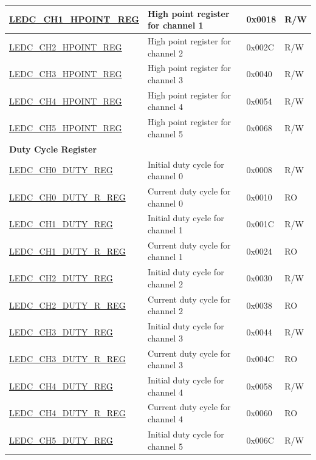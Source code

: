 \begin{longtable}{ | p{5.5cm} | p{7.2cm} | p{1.3cm} | p{1.5cm} | }
\hyperref[regdesc:LEDCCHNHPOINTREG]{LEDC\_CH1\_HPOINT\_REG} & High point register for channel 1 & 0x0018 & R/W \\ \hline
\hyperref[regdesc:LEDCCHNHPOINTREG]{LEDC\_CH2\_HPOINT\_REG} & High point register for channel 2 & 0x002C & R/W \\ \hline
\hyperref[regdesc:LEDCCHNHPOINTREG]{LEDC\_CH3\_HPOINT\_REG} & High point register for channel 3 & 0x0040 & R/W \\ \hline
\hyperref[regdesc:LEDCCHNHPOINTREG]{LEDC\_CH4\_HPOINT\_REG} & High point register for channel 4 & 0x0054 & R/W \\ \hline
\hyperref[regdesc:LEDCCHNHPOINTREG]{LEDC\_CH5\_HPOINT\_REG} & High point register for channel 5 & 0x0068 & R/W \\ \hline
\multicolumn{4}{|l|}{\textbf{Duty Cycle Register}} \\ \hline
\hyperref[regdesc:LEDCCHNDUTYREG]{LEDC\_CH0\_DUTY\_REG} & Initial duty cycle for channel 0 & 0x0008 & R/W \\ \hline
\hyperref[regdesc:LEDCCHNDUTYRREG]{LEDC\_CH0\_DUTY\_R\_REG} & Current duty cycle for channel 0 & 0x0010 & RO \\ \hline
\hyperref[regdesc:LEDCCHNDUTYREG]{LEDC\_CH1\_DUTY\_REG} & Initial duty cycle for channel 1 & 0x001C & R/W \\ \hline
\hyperref[regdesc:LEDCCHNDUTYRREG]{LEDC\_CH1\_DUTY\_R\_REG} & Current duty cycle for channel 1 & 0x0024 & RO \\ \hline
\hyperref[regdesc:LEDCCHNDUTYREG]{LEDC\_CH2\_DUTY\_REG} & Initial duty cycle for channel 2 & 0x0030 & R/W \\ \hline
\hyperref[regdesc:LEDCCHNDUTYRREG]{LEDC\_CH2\_DUTY\_R\_REG} & Current duty cycle for channel 2 & 0x0038 & RO \\ \hline
\hyperref[regdesc:LEDCCHNDUTYREG]{LEDC\_CH3\_DUTY\_REG} & Initial duty cycle for channel 3 & 0x0044 & R/W \\ \hline
\hyperref[regdesc:LEDCCHNDUTYRREG]{LEDC\_CH3\_DUTY\_R\_REG} & Current duty cycle for channel 3 & 0x004C & RO \\ \hline
\hyperref[regdesc:LEDCCHNDUTYREG]{LEDC\_CH4\_DUTY\_REG} & Initial duty cycle for channel 4 & 0x0058 & R/W \\ \hline
\hyperref[regdesc:LEDCCHNDUTYRREG]{LEDC\_CH4\_DUTY\_R\_REG} & Current duty cycle for channel 4 & 0x0060 & RO \\ \hline
\hyperref[regdesc:LEDCCHNDUTYREG]{LEDC\_CH5\_DUTY\_REG} & Initial duty cycle for channel 5 & 0x006C & R/W \\ \hline

\end{longtable}
